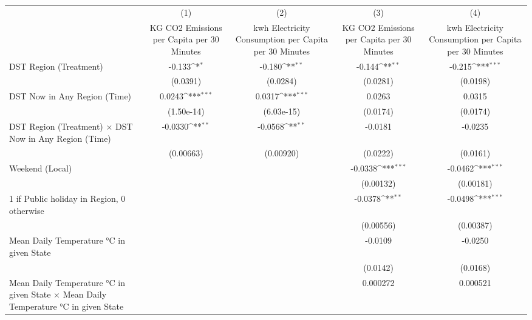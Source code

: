 {
\def\sym#1{\ifmmode^{#1}\else\(^{#1}\)\fi}
\begin{tabular}{l*{4}{c}}
\hline\hline
                    &\multicolumn{1}{c}{(1)}&\multicolumn{1}{c}{(2)}&\multicolumn{1}{c}{(3)}&\multicolumn{1}{c}{(4)}\\
                    &\multicolumn{1}{c}{KG CO2 Emissions per Capita per 30 Minutes}&\multicolumn{1}{c}{kwh Electricity Consumption per Capita per 30 Minutes}&\multicolumn{1}{c}{KG CO2 Emissions per Capita per 30 Minutes}&\multicolumn{1}{c}{kwh Electricity Consumption per Capita per 30 Minutes}\\
\hline
DST Region (Treatment)&      -0.133\sym{*}  &      -0.180\sym{**} &      -0.144\sym{**} &      -0.215\sym{***}\\
                    &    (0.0391)         &    (0.0284)         &    (0.0281)         &    (0.0198)         \\
[1em]
DST Now in Any Region (Time)&      0.0243\sym{***}&      0.0317\sym{***}&      0.0263         &      0.0315         \\
                    &  (1.50e-14)         &  (6.03e-15)         &    (0.0174)         &    (0.0174)         \\
[1em]
DST Region (Treatment) $\times$ DST Now in Any Region (Time)&     -0.0330\sym{**} &     -0.0568\sym{**} &     -0.0181         &     -0.0235         \\
                    &   (0.00663)         &   (0.00920)         &    (0.0222)         &    (0.0161)         \\
[1em]
Weekend (Local)     &                     &                     &     -0.0338\sym{***}&     -0.0462\sym{***}\\
                    &                     &                     &   (0.00132)         &   (0.00181)         \\
[1em]
1 if Public holiday in Region, 0 otherwise&                     &                     &     -0.0378\sym{**} &     -0.0498\sym{***}\\
                    &                     &                     &   (0.00556)         &   (0.00387)         \\
[1em]
Mean Daily Temperature °C in given State&                     &                     &     -0.0109         &     -0.0250         \\
                    &                     &                     &    (0.0142)         &    (0.0168)         \\
[1em]
Mean Daily Temperature °C in given State $\times$ Mean Daily Temperature °C in given State&                     &                     &    0.000272         &    0.000521         \\

\end{tabular}}
